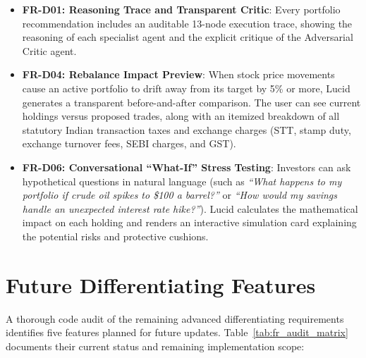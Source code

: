 \begin{itemize}
    \item \textbf{FR-D01: Reasoning Trace and Transparent Critic}: Every portfolio recommendation includes an auditable 13-node execution trace, showing the reasoning of each specialist agent and the explicit critique of the Adversarial Critic agent.
    \item \textbf{FR-D04: Rebalance Impact Preview}: When stock price movements cause an active portfolio to drift away from its target by 5\% or more, Lucid generates a transparent before-and-after comparison. The user can see current holdings versus proposed trades, along with an itemized breakdown of all statutory Indian transaction taxes and exchange charges (STT, stamp duty, exchange turnover fees, SEBI charges, and GST).
    \item \textbf{FR-D06: Conversational ``What-If'' Stress Testing}: Investors can ask hypothetical questions in natural language (such as \textit{``What happens to my portfolio if crude oil spikes to \$100 a barrel?''} or \textit{``How would my savings handle an unexpected interest rate hike?''}). Lucid calculates the mathematical impact on each holding and renders an interactive simulation card explaining the potential risks and protective cushions.
\end{itemize}

\section{Future Differentiating Features}
A thorough code audit of the remaining advanced differentiating requirements identifies five features planned for future updates. Table~\ref{tab:fr_audit_matrix} documents their current status and remaining implementation scope:

